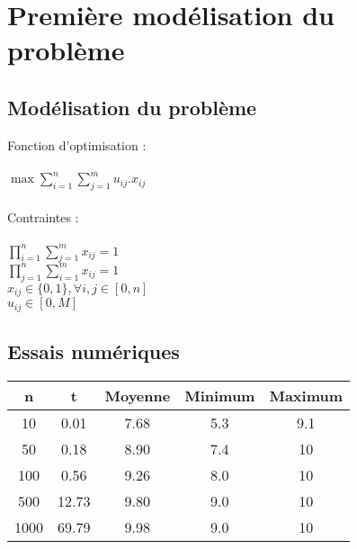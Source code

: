 \documentclass[paper=a4, fontsize=11pt]{scrartcl} %
\numberwithin{equation}{section} %
\numberwithin{figure}{section} %
\numberwithin{table}{section} %
\begin{document}


\newpage
\tableofcontents
\newpage



\newpage
\section{Premi\`ere mod\'elisation du probl\`eme}

\subsection{Mod\'elisation du probl\`eme}

Fonction d'optimisation : \\\\
$\max\sum_{i=1}^{n}\sum_{j=1}^{m} u_{ij}.x_{ij}$\\\\
Contraintes :\\\\
$\prod_{i=1}^{n}\sum_{j=1}^{m}x_{ij} = 1$\\
$\prod_{j=1}^{n}\sum_{i=1}^{m}x_{ij} = 1$\\
$x_{ij}\in\{0,1\}, \forall i,j\in[0,n]$\\
$u_{ij}\in[0,M]$


\subsection{Essais num\'eriques}

\begin{tabular}{|*{5}{c|}}
    \hline
     n  & t  & Moyenne  & Minimum  & Maximum\\
    \hline
     10  & 0.01  & 7.68  & 5.3  & 9.1\\
    \hline
     50  & 0.18  & 8.90  & 7.4 & 10\\
    \hline
     100  & 0.56  & 9.26 & 8.0 & 10\\
    \hline
     500  & 12.73 & 9.80 & 9.0 & 10\\
    \hline
     1000  & 69.79 & 9.98 & 9.0 & 10\\
    \hline
\end{tabular}
\end{document}
